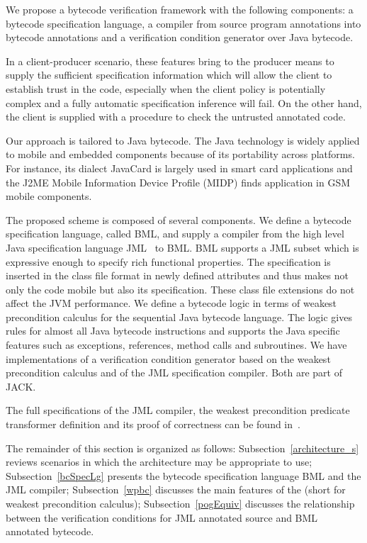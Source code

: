 We propose a bytecode verification framework with the following components: a bytecode specification language, a compiler from source
 program annotations into bytecode annotations and a verification condition generator over Java bytecode.

In a client-producer scenario, these features bring to the producer means to supply the sufficient specification information 
which will allow the client to establish trust in the code, especially when the client policy is potentially complex and a fully automatic specification inference
will fail. On the other hand, the client is supplied with a procedure to check the untrusted annotated code. 

  

Our approach is tailored to Java bytecode.
The Java technology is widely applied to mobile and embedded components because of its portability across platforms. 
For instance, its dialect JavaCard is largely used in smart card applications and the J2ME Mobile Information Device Profile 
(MIDP) finds application in GSM mobile components. 

The proposed scheme is composed of several components.
 We define a bytecode specification language, called BML, and supply a compiler from 
 the high level Java specification language JML~\cite{JMLRefMan} to BML. 
 BML supports a JML subset which is expressive enough to specify rich functional properties. 
The specification is inserted in the class file format in newly defined attributes and thus makes not
 only the code mobile but also its specification. These class
 file extensions do not affect the JVM performance.
We define a bytecode logic in terms of weakest precondition calculus for the sequential Java bytecode language. 
The logic gives rules for almost all Java bytecode instructions and supports the Java specific features such as
exceptions, references, method calls and subroutines.  
 We have implementations of a verification condition generator based on the weakest precondition calculus and of
 the JML specification compiler. Both are part of JACK.

  The full specifications of the JML compiler, the weakest precondition predicate transformer definition and its proof of correctness can be found in~\cite{JBL05MP}.
  
The remainder of this section is organized as follows: 
Subsection~\ref{architecture_s} reviews scenarios in which the architecture may be appropriate to use; 
 Subsection~\ref{bcSpecLg} presents the bytecode specification language BML and the JML compiler; Subsection~\ref{wpbc} discusses the main
features of the \wpi (short for weakest precondition calculus); Subsection~\ref{pogEquiv} discusses the relationship between the verification conditions for JML annotated source and BML annotated bytecode.















